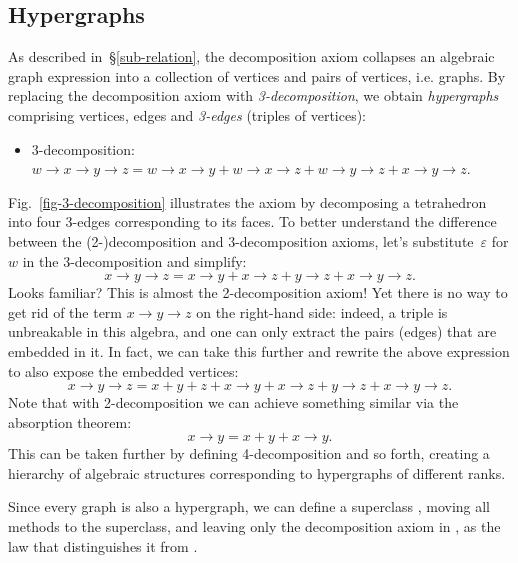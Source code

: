 \subsection{Hypergraphs}\label{sub-hypergraphs}

As described in~\S\ref{sub-relation}, the decomposition axiom collapses an algebraic
graph expression into a collection of vertices and pairs of vertices, i.e. graphs. By replacing
the decomposition axiom with \emph{3-decomposition}, we obtain \emph{hypergraphs} comprising
vertices, edges and \emph{3-edges} (triples of vertices):

\begin{itemize}
    \item 3-decomposition: $w \rightarrow x \rightarrow y \rightarrow z =
    w \rightarrow x \rightarrow y + w \rightarrow x \rightarrow z +
    w \rightarrow y \rightarrow z + x \rightarrow y \rightarrow z$.
\end{itemize}

Fig.~\ref{fig-3-decomposition} illustrates the axiom by decomposing a tetrahedron
into four 3-edges corresponding to its faces. To better understand the difference
between the (2-)decomposition and 3-decomposition
axioms, let's substitute~$\varepsilon$ for $w$ in the 3-decomposition and simplify:
\[
x \rightarrow y \rightarrow z = x \rightarrow y + x \rightarrow z + y \rightarrow z
+ x \rightarrow y \rightarrow z.
\]
Looks familiar? This is almost the 2-decomposition axiom! Yet there is no way to get rid
of the term $x \rightarrow y \rightarrow z$ on the right-hand side: indeed, a triple is
unbreakable
in this algebra, and one can only extract the pairs (edges) that are embedded in it.
In fact, we can take this further and rewrite the above expression to also expose the
embedded vertices:
\[
x \rightarrow y \rightarrow z = x + y + z + x \rightarrow y + x \rightarrow z
+ y \rightarrow z + x \rightarrow y \rightarrow z.
\]
Note that with 2-decomposition we can achieve something similar via the absorption theorem:
\[
x \rightarrow y = x + y + x \rightarrow y.
\]
This can be taken further by defining 4-decomposition and so forth, creating a hierarchy
of algebraic structures corresponding to hypergraphs of different ranks.

Since every graph is also a hypergraph, we can define a superclass
, moving all  methods to the superclass, and
leaving only the decomposition axiom in , as the law that distinguishes it from
.

